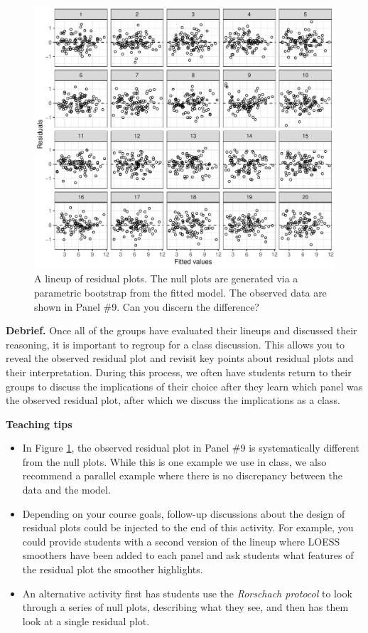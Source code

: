 \documentclass[12pt]{article}
\begin{document}
\begin{figure}
\centering
\includegraphics{figs/residual_lineup.pdf}
\caption{\label{fig:lineupresid} A lineup of residual plots. The null
plots are generated via a parametric bootstrap from the fitted model.
The observed data are shown in Panel \#9. Can you discern the
difference?}
\end{figure}

\textbf{Debrief.} Once all of the groups have evaluated their lineups
and discussed their reasoning, it is important to regroup for a class
discussion. This allows you to reveal the observed residual plot and
revisit key points about residual plots and their interpretation. During
this process, we often have students return to their groups to discuss
the implications of their choice after they learn which panel was the
observed residual plot, after which we discuss the implications as a
class.

\textbf{Teaching tips}

\begin{itemize}
\item
  In Figure \ref{fig:lineupresid}, the observed residual plot in Panel
  \#9 is systematically different from the null plots. While this is one
  example we use in class, we also recommend a parallel example where
  there is no discrepancy between the data and the model.
\item
  Depending on your course goals, follow-up discussions about the design
  of residual plots could be injected to the end of this activity. For
  example, you could provide students with a second version of the
  lineup where LOESS smoothers have been added to each panel and ask
  students what features of the residual plot the smoother highlights.
\item
  An alternative activity first has students use the
  \emph{Rorschach protocol} \citep{Buja-2009bd} to look through a series
  of null plots, describing what they see, and then has them look at a
  single residual plot.
\end{itemize}
\end{document}
